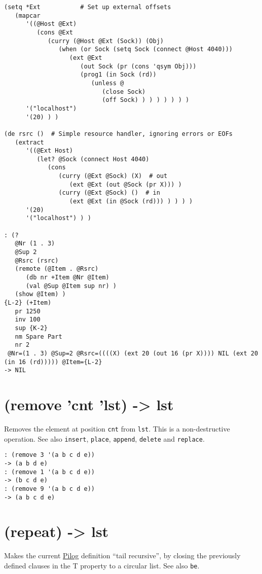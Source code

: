 {{{{{{{{\begin{verbatim}
(setq *Ext           # Set up external offsets
   (mapcar
      '((@Host @Ext)
         (cons @Ext
            (curry (@Host @Ext (Sock)) (Obj)
               (when (or Sock (setq Sock (connect @Host 4040)))
                  (ext @Ext
                     (out Sock (pr (cons 'qsym Obj)))
                     (prog1 (in Sock (rd))
                        (unless @
                           (close Sock)
                           (off Sock) ) ) ) ) ) ) )
      '("localhost")
      '(20) ) )

(de rsrc ()  # Simple resource handler, ignoring errors or EOFs
   (extract
      '((@Ext Host)
         (let? @Sock (connect Host 4040)
            (cons
               (curry (@Ext @Sock) (X)  # out
                  (ext @Ext (out @Sock (pr X))) )
               (curry (@Ext @Sock) ()  # in
                  (ext @Ext (in @Sock (rd))) ) ) ) )
      '(20)
      '("localhost") ) )

: (?
   @Nr (1 . 3)
   @Sup 2
   @Rsrc (rsrc)
   (remote (@Item . @Rsrc)
      (db nr +Item @Nr @Item)
      (val @Sup @Item sup nr) )
   (show @Item) )
{L-2} (+Item)
   pr 1250
   inv 100
   sup {K-2}
   nm Spare Part
   nr 2
 @Nr=(1 . 3) @Sup=2 @Rsrc=((((X) (ext 20 (out 16 (pr X)))) NIL (ext 20 (in 16 (rd))))) @Item={L-2}
-> NIL
\end{verbatim}

 
\section{(remove 'cnt 'lst) -> lst}
\label{sec-8-1-18-18}


Removes the element at position \texttt{cnt} from \texttt{lst}. This is a
non-destructive operation. See also \texttt{insert}, \texttt{place}, \texttt{append},
\texttt{delete} and \texttt{replace}.


\begin{verbatim}
: (remove 3 '(a b c d e))
-> (a b d e)
: (remove 1 '(a b c d e))
-> (b c d e)
: (remove 9 '(a b c d e))
-> (a b c d e)
\end{verbatim}

 
\section{(repeat) -> lst}
\label{sec-8-1-18-19}


Makes the current \hyperref[ref.html-pilog]{Pilog} definition ``tail recursive'',
by closing the previously defined clauses in the T property to a
circular list. See also \texttt{be}.


}}}}}}}}
